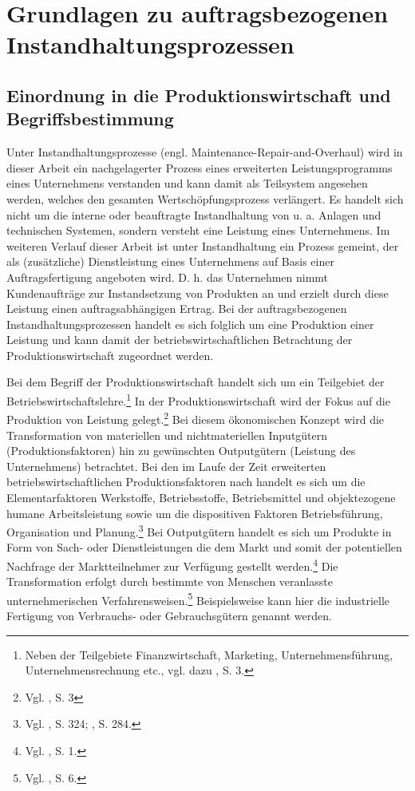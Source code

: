 \chapter{Grundlagen zu auftragsbezogenen Instandhaltungsprozessen}\label{Instandhaltung}
\setcounter{footnote}{4}  %

\section{Einordnung in die Produktionswirtschaft und Begriffsbestimmung}

Unter Instandhaltungsprozesse (engl. Maintenance-Repair-and-Overhaul) wird in dieser Arbeit ein nachgelagerter Prozess eines erweiterten Leistungsprogramms eines Unternehmens verstanden und kann damit als Teilsystem angesehen werden, welches den gesamten Wertschöpfungsprozess verlängert. Es handelt sich nicht um die interne oder beauftragte Instandhaltung von u. a. Anlagen und technischen Systemen, sondern versteht eine Leistung eines Unternehmens. Im weiteren Verlauf dieser Arbeit ist unter Instandhaltung ein Prozess gemeint, der als (zusätzliche) Dienstleistung eines Unternehmens auf Basis einer Auftragsfertigung angeboten wird. D. h. das Unternehmen nimmt Kundenaufträge zur Instandsetzung von Produkten an und erzielt durch diese Leistung einen auftragsabhängigen Ertrag. Bei der auftragsbezogenen Instandhaltungsprozessen handelt es sich folglich um eine Produktion einer Leistung und kann damit der betriebswirtschaftlichen Betrachtung der Produktionswirtschaft zugeordnet werden.

Bei dem Begriff der Produktionswirtschaft handelt sich um ein Teilgebiet der Betriebswirtschaftslehre.\footnote{Neben der Teilgebiete Finanzwirtschaft, Marketing, Unternehmensführung, Unternehmensrechnung etc., vgl. dazu \cite{Dyckhoff2010}, S. 3.} In der Produktionswirtschaft wird der Fokus auf die Produktion von Leistung gelegt.\footnote{Vgl. \cite{Dyckhoff2010}, S. 3} Bei diesem ökonomischen Konzept wird die Transformation von materiellen und nichtmateriellen Inputgütern (Produktionsfaktoren) hin zu gewünschten Outputgütern (Leistung des Unternehmens) betrachtet. Bei den im Laufe der Zeit erweiterten betriebswirtschaftlichen Produktionsfaktoren nach \citet[S. 71]{Gutenberg:1959aa} handelt es sich um die Elementarfaktoren Werkstoffe, Betriebsstoffe, Betriebsmittel und objektezogene humane Arbeitsleistung sowie um die dispositiven Faktoren Betriebsführung, Organisation und Planung.\footnote{Vgl. \cite{Schubert:2005aa}, S. 324; \cite{Weber:1999aa}, S. 284.} Bei Outputgütern handelt es sich um Produkte in Form von Sach- oder Dienstleistungen die dem Markt und somit der potentiellen Nachfrage der Marktteilnehmer zur Verfügung gestellt werden.\footnote{Vgl. \cite{Schmidt:2012aa}, S. 1.} Die Transformation erfolgt durch bestimmte von Menschen veranlasste unternehmerischen Verfahrensweisen.\footnote{Vgl. \cite{tempelmeier1994produktion}, S. 6.} Beispielsweise kann hier die industrielle Fertigung von Verbrauchs- oder Gebrauchsgütern genannt werden.

